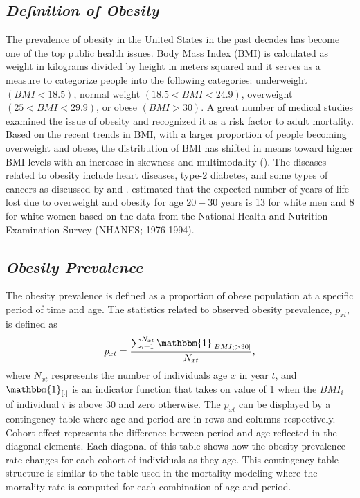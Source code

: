 \documentclass[11pt,letterpaper]{article}
\numberwithin{equation}{section}
\begin{document}
\subsection{\textit{Definition of Obesity}}
The prevalence of obesity in the United States in the past decades has become one of the top public health issues. Body Mass Index (BMI) is calculated as weight in kilograms divided by height in meters squared and it serves as a measure to categorize people into  the following categories: underweight $(BMI < 18.5)$, normal weight $(18.5 < BMI < 24.9)$, overweight $(25 < BMI< 29.9)$, or obese $(BMI > 30)$. A great number of medical studies examined the issue of obesity and recognized it as a risk factor to adult mortality. Based on the recent trends in BMI, with a larger proportion of people becoming overweight and obese, the distribution of BMI has shifted in means toward higher BMI levels with an increase in skewness and multimodality (\cite{Miljkovic+Shaik+Miljkovic:2005}). The diseases related to obesity include heart diseases, type-2 diabetes, and some types of cancers as discussed by \cite{Must+Spadano+Coakley+Field+Colditz+Dietz:1999} and \cite{Ebbeling+Pawlak+Ludwig:2002}. \cite{Fontaine+Redden+Wang+Westfall+Allison:2003} estimated that the expected number of years of life lost due to overweight and obesity for age $20-30$ years is 13 for white men and 8 for white women based on the data from the National Health and Nutrition Examination Survey (NHANES; 1976-1994).

\subsection{\textit{Obesity Prevalence}}
The obesity prevalence is defined as a proportion of obese population at a specific period of time and age. The statistics related to observed obesity prevalence, $p_{xt}$, is defined as
\begin{equation}\label{eq:a1}
p_{xt}=\frac{\sum_{i=1}^{N_{xt}}{\mathbbm{1}_{[BMI_{i}>30]}}}{N_{xt}},
\end{equation}
where $N_{xt}$ respresents the number of individuals age $x$ in year $t$, and ${\mathbbm{1}_{[.]}}$ is an indicator function that takes on value of 1 when the $BMI_{i}$ of individual $i$ is above 30 and zero otherwise. The $p_{xt}$ can be displayed by a contingency table where age and period are in rows and columns respectively. Cohort effect represents the difference between period and age reflected in the diagonal elements. Each diagonal of this table shows how the obesity prevalence rate changes for each cohort of individuals as they age. This contingency table structure is similar to the table used in the mortality modeling where the mortality rate is computed for each combination of age and period.
\end{document}
